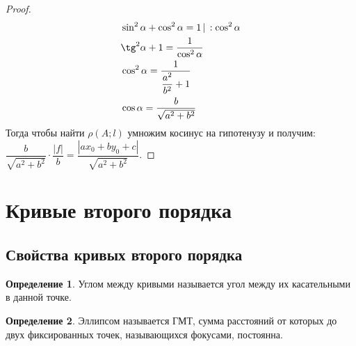 \documentclass[12pt]{article}
\theoremstyle{definition}
\newtheorem{definition}{Определение}
\begin{document}
\begin{proof}
    \begin{align*}
        &\sin^2\alpha+\cos^2\alpha=1\, | \, :\cos^2 \alpha\\
        &\tg^2\alpha+1=\frac{1}{\cos^2\alpha}\\
        &\cos^2\alpha=\frac{1}{\dfrac{a^2}{b^2}+1}\\
        &\cos \alpha = \frac{b}{\sqrt{a^2+b^2}}
    \end{align*}
    Тогда чтобы найти $\rho(A;l)$ умножим косинус на гипотенузу и получим: $\dfrac{b}{\sqrt{a^2+b^2}} \cdot \dfrac{|f|}{b}=\dfrac{|ax_0+by_0+c|}{\sqrt{a^2+b^2}}$. 
    \end{proof}

    \section{Кривые второго порядка}
    \subsection{Свойства кривых второго порядка}

    \begin{definition}
        Углом между кривыми называется угол между их касательными в данной точке.
    \end{definition}

    \begin{definition}
        Эллипсом называется ГМТ, сумма расстояний от которых до двух фиксированных точек, называющихся фокусами, постоянна.
    \end{definition}

    \begin{center}
    \end{center}
\end{document}
